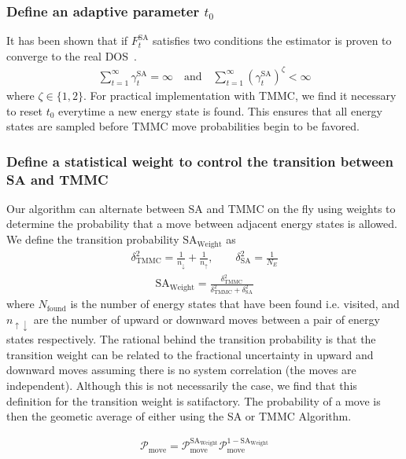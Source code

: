 \documentclass[letterpaper,twocolumn,amsmath,amssymb,pre,aps,10pt]{revtex4-1}
\begin{document}
\subsubsection{Define an adaptive parameter $t_0$}
It has been shown that if $F_{t}^{\text{SA}}$ satisfies two conditions the estimator is proven to converge to the real DOS~\cite{liang2006theory, liang2007stochastic}.
\begin{align}
\sum_{t=1}^\infty \gamma_{t}^{\text{SA}} = \infty \quad\textrm{and}\quad
\sum_{t=1}^\infty (\gamma_{t}^{\text{SA}})^\zeta < \infty
\end{align}
where $\zeta \in \{1,2\}$.  For practical implementation with TMMC, we find it necessary to reset $t_0$ everytime a new energy state is found.  This ensures that all energy states are sampled before TMMC move probabilities begin to be favored.  

\subsubsection{Define a statistical weight to control the transition between SA and TMMC}
Our algorithm can alternate between SA and TMMC on the fly using weights to determine the probability that a move between adjacent energy states is allowed.  We define the transition probability $\text{SA}_{\text{Weight}}$ as
\begin{align}
\delta_{\text{TMMC}}^2 =\frac{1}{n_\downarrow}+\frac{1}{n_\uparrow}, \quad\quad
\delta_{\text{SA}}^2 = \frac{1}{N_E}
\end{align}
\begin{align}
\text{SA}_{\text{Weight}} =\frac{\delta_{\text{TMMC}}^2}{\delta_{\text{TMMC}}^2 + \delta_{\text{SA}}^2}
\end{align}
where $N_\text{found}$ is the number of energy states that have been found i.e. visited, and $n_{\uparrow\downarrow}$ are the number of upward or downward moves between a pair of energy states respectively.  The rational behind the transition probability is that the transition weight can be related to the fractional uncertainty in upward and downward moves assuming there is no system correlation (the moves are independent).  Although this is not necessarily the case, we find that this definition for the transition weight is satifactory. The probability of a move is then the geometic average of either using the SA or TMMC Algorithm. 

\begin{align}
\mathcal{P}_\text{move} = \mathcal{P}_\text{move}^{\text{SA}_\text{Weight}} \mathcal{P}_\text{move}^{1-\text{SA}_\text{Weight}}
\end{align}
\end{document}
